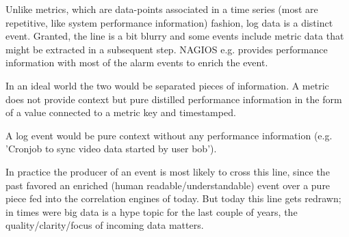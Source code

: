 Unlike metrics, which are data-points associated in a time series (most are repetitive, like system performance information)
fashion, log data is a distinct event. Granted, the line is a bit blurry and some events include metric data that
might be extracted in a subsequent step. NAGIOS e.g. provides performance information with most of the alarm events to enrich the event.

In an ideal world the two would be separated pieces of information. A metric does not provide context
but pure distilled performance information in the form of a value connected to a metric key and timestamped.

A log event would be pure context without any performance information (e.g. 'Cronjob to sync video data started by user bob'). 

In practice the producer of an event is most likely to cross this line, since the past favored an enriched (human readable/understandable) event over a
pure piece fed into the correlation engines of today. But today this line gets redrawn; in times were big data is a hype topic for the last couple
of years, the quality/clarity/focus of incoming data matters.
